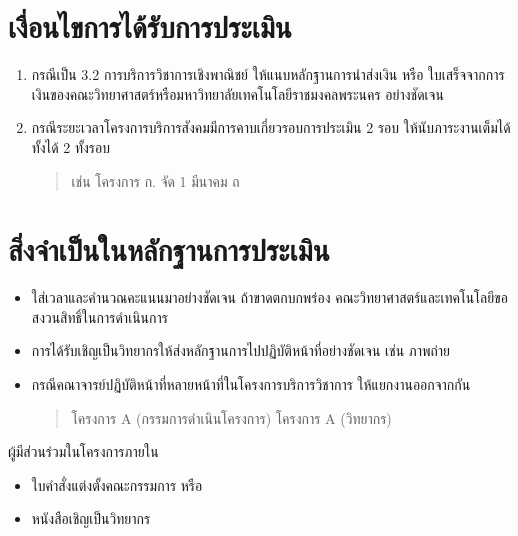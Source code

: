 \documentclass[a4paper,12pt,english]{sphinxmanual}
\begin{document}
\section{เงื่อนไขการได้รับการประเมิน}
\label{\detokenize{3service:id3}}\begin{enumerate}
%
\item {} 
กรณีเป็น 3.2 การบริการวิชาการเชิงพาณิชย์ ให้แนบหลักฐานการนำส่งเงิน หรือ ใบเสร็จจากการเงินของคณะวิทยาศาสตร์หรือมหาวิทยาลัยเทคโนโลยีราชมงคลพระนคร อย่างชัดเจน

\item {} 
กรณีระยะเวลาโครงการบริการสังคมมีการคาบเกี่ยวรอบการประเมิน 2 รอบ ให้นับภาระงานเต็มได้ทั้งได้ 2 ทั้งรอบ
\begin{quote}

เช่น โครงการ ก. จัด 1 มีนาคม ถ
\end{quote}

\end{enumerate}


\section{สิ่งจำเป็นในหลักฐานการประเมิน}
\label{\detokenize{3service:id4}}\begin{itemize}
\item {} 
 ใส่เวลาและคำนวณคะแนนมาอย่างชัดเจน ถ้าขาดตกบกพร่อง คณะวิทยาศาสตร์และเทคโนโลยีขอสงวนสิทธิ์ในการดำเนินการ

\item {} 
การได้รับเชิญเป็นวิทยากรให้ส่งหลักฐานการไปปฏิบัติหน้าที่อย่างชัดเจน เช่น ภาพถ่าย

\item {} 
กรณีคณาจารย์ปฏิบัติหน้าที่หลายหน้าที่ในโครงการบริการวิชาการ ให้แยกงานออกจากกัน
\begin{quote}

โครงการ A (กรรมการดำเนินโครงการ)
โครงการ A (วิทยากร)
\end{quote}

\end{itemize}

ผู้มีส่วนร่วมในโครงการภายใน
\begin{itemize}
\item {} 
ใบคำสั่งแต่งตั้งคณะกรรมการ หรือ

\item {} 
หนังสือเชิญเป็นวิทยากร

\end{itemize}
\end{document}
